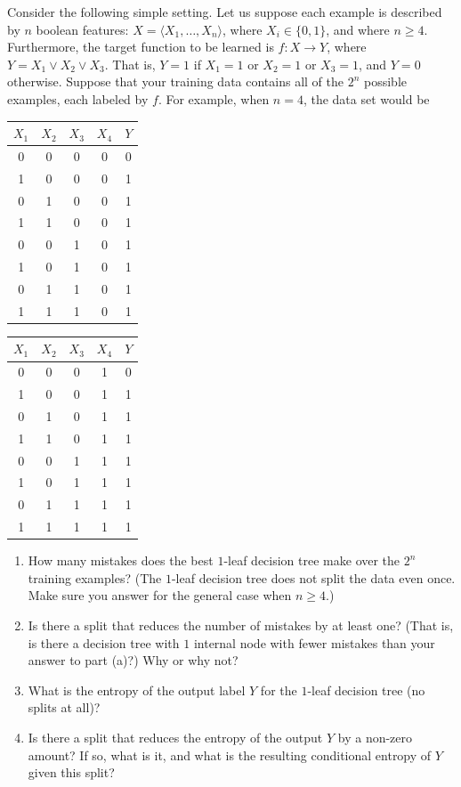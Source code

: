 \documentclass[11pt]{article}
\begin{document}
Consider the following simple setting. Let us suppose each example is described by $n$ boolean features: $X = \langle X_1, \ldots, X_n \rangle$, where $X_i \in \{0, 1\}$, and where $n \geq 4$. Furthermore, the target function to be learned is $f : X \rightarrow Y$, where $Y = X_1 \vee X_2 \vee X_3$. That is, $Y = 1$ if $X_1 = 1$ or $X_2 = 1$ or $X_3 = 1$, and $Y = 0$ otherwise. Suppose that your training data contains all of the $2^n$ possible examples, each labeled by $f$. For example, when $n = 4$, the data set would be
\begin{table}[H]
\centering
\begin{tabular}{cccc|c}
$X_1$ & $X_2$ & $X_3$ & $X_4$ & $Y$\\ \hline
0 & 0 & 0 & 0 & 0\\
1 & 0 & 0 & 0 & 1\\
0 & 1 & 0 & 0 & 1\\
1 & 1 & 0 & 0 & 1\\
0 & 0 & 1 & 0 & 1\\
1 & 0 & 1 & 0 & 1\\
0 & 1 & 1 & 0 & 1\\
1 & 1 & 1 & 0 & 1\\
\end{tabular}
\quad \quad \quad \quad
\begin{tabular}{cccc|c}
$X_1$ & $X_2$ & $X_3$ & $X_4$ & $Y$\\ \hline
0 & 0 & 0 & 1 & 0\\
1 & 0 & 0 & 1 & 1\\
0 & 1 & 0 & 1 & 1\\
1 & 1 & 0 & 1 & 1\\
0 & 0 & 1 & 1 & 1\\
1 & 0 & 1 & 1 & 1\\
0 & 1 & 1 & 1 & 1\\
1 & 1 & 1 & 1 & 1\\
\end{tabular}
\end{table}

\begin{enumerate}
\item {} How many mistakes does the best $1$-leaf decision tree make over the $2^n$ training examples? (The $1$-leaf decision tree does not split the data even once. Make sure you answer for the general case when $n \geq 4$.)

\item {} Is there a split that reduces the number of mistakes by at least one? (That is, is there a decision tree with $1$ internal node with fewer mistakes than your answer to part (a)?) Why or why not?

\item {} What is the entropy of the output label $Y$ for the $1$-leaf decision tree (no splits at all)?

\item {} Is there a split that reduces the entropy of the output $Y$ by a non-zero amount? If so, what is it, and what is the resulting conditional entropy of $Y$ given this split?

\end{enumerate}
\end{document}
